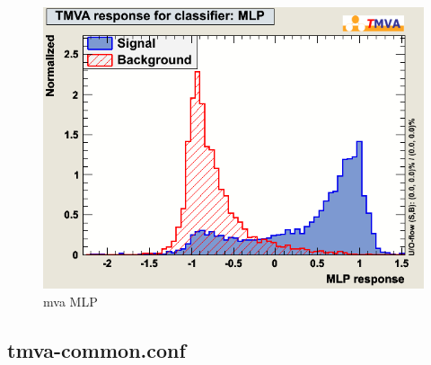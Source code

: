 \begin{figure}[h]
\begin{center}
\includegraphics[width=1.0\textwidth]{images/ahMva_MLP.png}
\caption{mva MLP}
\label{fig:mvamlp}
\end{center}
\end{figure}


\subsection{tmva-common.conf}







%






